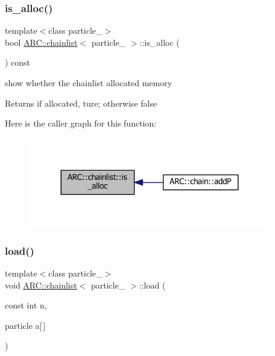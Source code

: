 \subsubsection{\texorpdfstring{is\+\_\+alloc()}{is\_alloc()}}
{\footnotesize\ttfamily template$<$class particle\+\_\+$>$ \\
bool \hyperlink{classARC_1_1chainlist}{A\+R\+C\+::chainlist}$<$ particle\+\_\+ $>$\+::is\+\_\+alloc (\begin{DoxyParamCaption}{ }\end{DoxyParamCaption}) const\hspace{0.3cm}{\ttfamily [inline]}}



show whether the chainlist allocated memory 

\begin{DoxyReturn}{Returns}
if allocated, ture; otherwise false 
\end{DoxyReturn}
Here is the caller graph for this function\+:
\nopagebreak
\begin{figure}[H]
\begin{center}
\leavevmode
\includegraphics[width=300pt]{classARC_1_1chainlist_a0e2f35b8eabe9d9ecd77ed9f24e083de_icgraph}
\end{center}
\end{figure}
\hypertarget{classARC_1_1chainlist_a0b6d027aa684f6db74fa75f418dbdd70}{}\label{classARC_1_1chainlist_a0b6d027aa684f6db74fa75f418dbdd70} 
\subsubsection{\texorpdfstring{load()}{load()}}
{\footnotesize\ttfamily template$<$class particle\+\_\+$>$ \\
void \hyperlink{classARC_1_1chainlist}{A\+R\+C\+::chainlist}$<$ particle\+\_\+ $>$\+::load (\begin{DoxyParamCaption}\item[{const int}]{n,  }\item[{particle}]{a\mbox{[}$\,$\mbox{]} }\end{DoxyParamCaption})\hspace{0.3cm}{\ttfamily [inline]}}



